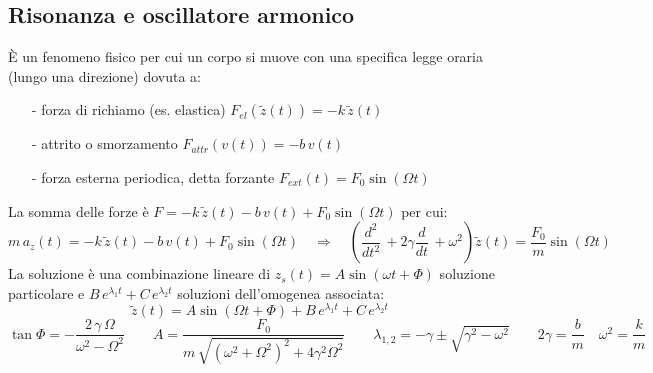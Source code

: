 \documentclass[a4paper]{article}
\newcommand\dt{\frac{d}{dt}\,}
\newcommand\dts{\frac{d^2}{dt^2}\,}
\begin{document}
\subsection{Risonanza e oscillatore armonico}
È un fenomeno fisico per cui un corpo si muove con una specifica legge oraria (lungo una direzione) dovuta a:
\begin{itemize}[topsep=3pt, itemsep=0pt]
	\item[-] forza di richiamo (es. elastica) \(F_{el}(\tilde{z}(t)) = -k \, \tilde{z}(t)\)
	\item[-] attrito o smorzamento \(F_{attr}(v(t)) = -b \, v(t)\)
	\item[-] forza esterna periodica, detta forzante \(F_{ext}(t) = F_0 \sin (\Omega t)\)
\end{itemize}
La somma delle forze è \(F = -k \, \tilde{z}(t) - b \, v(t) + F_0 \sin (\Omega t)\) per cui:
\[m \, a_z(t) = -k \, \tilde{z}(t) - b \, v(t) + F_0 \sin (\Omega t) \quad \Rightarrow \quad \left(\dts + 2\gamma \dt + \omega^2\right) \tilde{z}(t) = \frac{F_0}{m} \sin (\Omega t)\]
La soluzione è una combinazione lineare di \(z_s(t) = A \sin (\omega t + \Phi)\) soluzione particolare e
\(B \, e^{\lambda_1 t} + C \, e^{\lambda_2 t}\) soluzioni dell'omogenea associata:
\[\tilde{z}(t) = A \sin (\Omega t + \Phi) + B \, e^{\lambda_1 t} + C \, e^{\lambda_2 t}\]
\[\tan \Phi = - \frac{2 \, \gamma \, \Omega}{\omega^2 - \Omega^2} \qquad A = \frac{F_0}{m \, \sqrt{(\omega^2 + \Omega^2)^2 + 4 \gamma^2 \Omega^2}} \qquad \lambda_{1,2} = -\gamma \pm \sqrt{\gamma^2 - \omega^2} \qquad 2\gamma = \frac{b}{m} \quad \omega^2 = \frac{k}{m}\]
\end{document}
